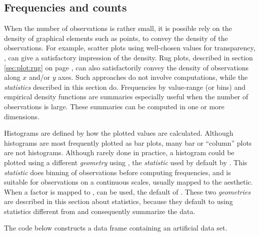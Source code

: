\documentclass[krantz2]{krantz}\usepackage{knitr}
\begin{document}

\subsection{Frequencies and counts}\label{sec:histogram}\label{sec:plot:histogram}

When the number of observations is rather small, it is possible rely on the density of graphical elements such as points, to convey the density of the observations. For example, scatter plots using well-chosen values for transparency, , can give a satisfactory impression of the density. Rug plots, described in section \ref{sec:plot:rug} on page \pageref{sec:plot:rug}, can also satisfactorily convey the density of observations along $x$ and/or $y$ axes. Such approaches do not involve computations, while the \emph{statistics} described in this section do. Frequencies by value-range (or bins) and empirical density functions are summaries especially useful when the number of observations is large. These summaries can be computed in one or more dimensions.

Histograms are defined by how the plotted values are calculated. Although histograms are most frequently plotted as bar plots, many bar or ``column'' plots are not histograms. Although rarely done in practice, a histogram could be plotted using a different \emph{geometry} using , the \emph{statistic} used by default by . This \emph{statistic} does binning of observations before computing frequencies, and is suitable for observations on a continuous scales, usually mapped to the  aesthetic. When a factor is mapped to ,  can be used, the default  of . These two \emph{geometries} are described in this section about statistics, because they default to using statistics different from  and consequently summarize the data.

The code below constructs a data frame containing an artificial data set.

\begin{knitrout}\footnotesize
{}\color{fgcolor}\begin{kframe}
\begin{alltt}
\hlstd{(}\hlstd{)}
 \hlkwb{<-}
  \hlstd{(} \hlstd{=} \hlstd{(}\hlstd{),}
              \hlstd{=} \hlstd{(}\hlstd{(}\hlstd{,} \hlopt{-}\hlstd{,} \hlstd{),} \hlstd{(}\hlstd{,} \hlstd{,} \hlstd{)),}
              \hlstd{=} \hlstd{(}\hlstd{(}\hlstd{(}\hlstd{,} \hlstd{),} \hlstd{(}\hlstd{,} \hlstd{))) )}
\end{alltt}
\end{kframe}
\end{knitrout}
\end{document}
